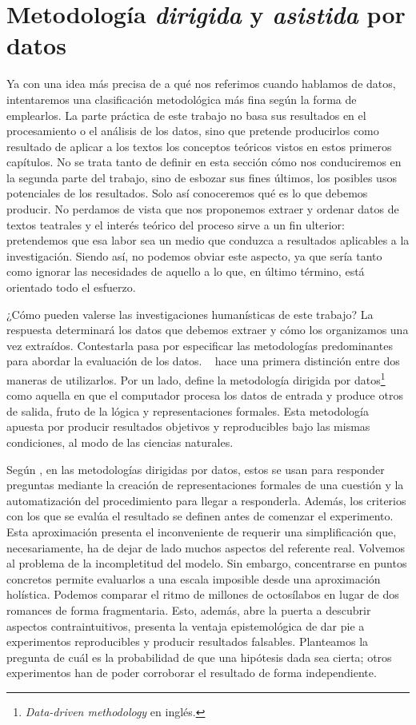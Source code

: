 \section{Metodología \textit{dirigida} y \textit{asistida} por datos}
Ya con una idea más precisa de a qué nos referimos cuando hablamos de datos, intentaremos una clasificación metodológica más fina según la forma de emplearlos. La parte práctica de este trabajo no basa sus resultados en el procesamiento o el análisis de los datos, sino que pretende producirlos como resultado de aplicar a los textos los conceptos teóricos vistos en estos primeros capítulos. No se trata tanto de definir en esta sección cómo nos conduciremos en la segunda parte del trabajo, sino de esbozar sus fines últimos, los posibles usos potenciales de los resultados. Solo así conoceremos qué es lo que debemos producir. No perdamos de vista que nos proponemos extraer y ordenar datos de textos teatrales y el interés teórico del proceso sirve a un fin ulterior: pretendemos que esa labor sea un medio que conduzca a resultados aplicables a la investigación. Siendo así, no podemos obviar este aspecto, ya que sería tanto como ignorar las necesidades de aquello a lo que, en último término, está orientado todo el esfuerzo. 

¿Cómo pueden valerse las investigaciones humanísticas de este trabajo? La respuesta determinará los datos que debemos extraer y cómo los organizamos una vez extraídos. Contestarla pasa por especificar las metodologías predominantes para abordar la evaluación de los datos. \citeauthor{escobar2021}~\parencite*[7-8]{escobar2021} hace una primera distinción entre dos maneras de utilizarlos. Por un lado, define la metodología dirigida por datos\footnote{\textit{Data-driven methodology} en inglés.} como aquella en que el computador procesa los datos de entrada y produce otros de salida, fruto de la lógica y representaciones formales. Esta metodología apuesta por producir resultados objetivos y reproducibles bajo las mismas condiciones, al modo de las ciencias naturales.

Según \citeauthor{escobar2021}, en las metodologías dirigidas por datos, estos se usan para responder preguntas mediante la creación de representaciones formales de una cuestión y la automatización del procedimiento para llegar a responderla. Además, los criterios con los que se evalúa el resultado se definen antes de comenzar el experimento. Esta aproximación presenta el inconveniente de requerir una simplificación que, necesariamente, ha de dejar de lado muchos aspectos del referente real. Volvemos al problema de la incompletitud del modelo. Sin embargo, concentrarse en puntos concretos permite evaluarlos a una escala imposible desde una aproximación holística. Podemos comparar el ritmo de millones de octosílabos en lugar de dos romances de forma fragmentaria. Esto, además, abre la puerta a descubrir aspectos contraintuitivos, presenta la ventaja epistemológica de dar pie a experimentos reproducibles y producir resultados falsables. Planteamos la pregunta de cuál es la probabilidad de que una hipótesis dada sea cierta; otros experimentos han de poder corroborar el resultado de forma independiente. 

